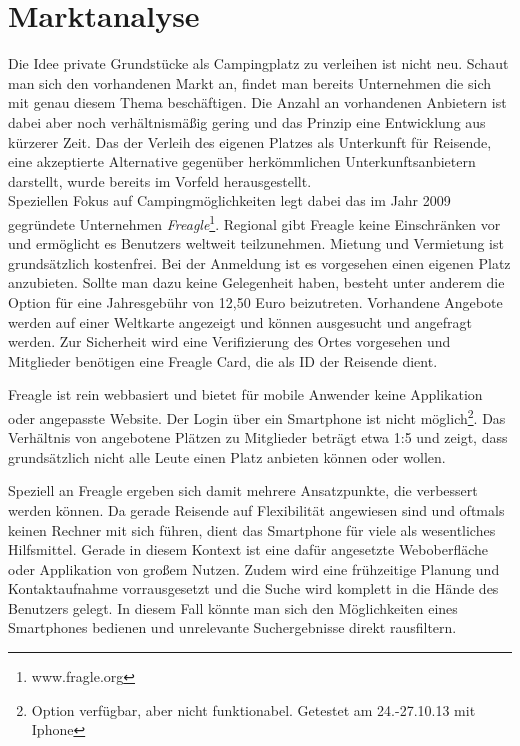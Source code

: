 
\section{Marktanalyse}
    Die Idee private Grundstücke als Campingplatz zu verleihen ist nicht neu. Schaut man sich den vorhandenen Markt an, findet man bereits Unternehmen die sich mit genau diesem Thema beschäftigen. Die Anzahl an vorhandenen Anbietern ist dabei aber noch verhältnismäßig gering und das Prinzip eine Entwicklung aus kürzerer Zeit. Das der Verleih des eigenen Platzes als Unterkunft für Reisende, eine akzeptierte Alternative gegenüber herkömmlichen Unterkunftsanbietern darstellt, wurde bereits im Vorfeld herausgestellt.\\
    Speziellen Fokus auf Campingmöglichkeiten legt dabei das im Jahr 2009 gegründete Unternehmen \textit{Freagle}\footnote{www.fragle.org}. Regional gibt Freagle keine Einschränken vor und ermöglicht es Benutzers weltweit teilzunehmen. Mietung und Vermietung ist grundsätzlich kostenfrei. Bei der Anmeldung ist es vorgesehen einen eigenen Platz anzubieten. Sollte man dazu keine Gelegenheit haben, besteht unter anderem die Option für eine Jahresgebühr von 12,50 Euro beizutreten. Vorhandene Angebote werden auf einer Weltkarte angezeigt und können ausgesucht und angefragt werden. Zur Sicherheit wird eine Verifizierung des Ortes vorgesehen und Mitglieder benötigen eine Freagle Card, die als ID der Reisende dient.

    Freagle ist rein webbasiert und bietet für mobile Anwender keine  Applikation oder angepasste Website. Der Login über ein Smartphone ist nicht möglich\footnote{Option verfügbar, aber nicht funktionabel. Getestet am 24.-27.10.13 mit Iphone}.
    Das Verhältnis von angebotene Plätzen zu Mitglieder beträgt etwa 1:5 und zeigt, dass grundsätzlich nicht alle Leute einen Platz anbieten können oder wollen.

    Speziell an Freagle ergeben sich damit mehrere Ansatzpunkte, die verbessert werden können. Da gerade Reisende auf Flexibilität angewiesen sind und oftmals keinen Rechner mit sich führen, dient das Smartphone für viele als wesentliches Hilfsmittel. Gerade in diesem Kontext ist eine dafür angesetzte Weboberfläche oder Applikation von großem Nutzen. Zudem wird eine frühzeitige Planung und Kontaktaufnahme vorrausgesetzt und die Suche wird komplett in die Hände des Benutzers gelegt. In diesem Fall könnte man sich den Möglichkeiten eines Smartphones bedienen und unrelevante Suchergebnisse direkt rausfiltern. 

